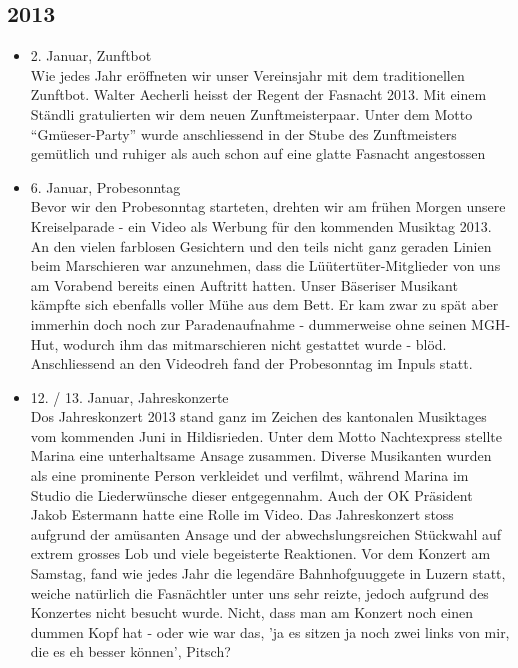 \subsection*{2013}
\begin{history}


      \begin{itemize}

            \item 2. Januar, Zunftbot\\
                  Wie jedes Jahr eröffneten wir unser Vereinsjahr mit dem traditionellen
                  Zunftbot. Walter Aecherli heisst der Regent der Fasnacht 2013. Mit einem
                  Ständli gratulierten wir dem neuen Zunftmeisterpaar. Unter dem Motto
                  \enquote{Gmüeser-Party} wurde anschliessend in der Stube des
                  Zunftmeisters gemütlich und ruhiger als auch schon auf eine glatte
                  Fasnacht angestossen

            \item 6. Januar, Probesonntag\\
                  Bevor wir den Probesonntag starteten, drehten wir am frühen Morgen
                  unsere Kreiselparade - ein Video als Werbung für den kommenden Musiktag
                  2013. An den vielen farblosen Gesichtern und den teils nicht ganz
                  geraden Linien beim Marschieren war anzunehmen, dass die
                  Lüütertüter-Mitglieder von uns am Vorabend bereits einen Auftritt
                  hatten. Unser Bäseriser Musikant kämpfte sich ebenfalls voller Mühe aus
                  dem Bett. Er kam zwar zu spät aber immerhin doch noch zur
                  Paradenaufnahme - dummerweise ohne seinen MGH-Hut, wodurch ihm das
                  mitmarschieren nicht gestattet wurde - blöd. Anschliessend an den
                  Videodreh fand der Probesonntag im Inpuls statt.

            \item 12. / 13. Januar, Jahreskonzerte\\
                  Dos Jahreskonzert 2013 stand ganz im Zeichen des kantonalen Musiktages
                  vom kommenden Juni in Hildisrieden. Unter dem Motto Nachtexpress stellte
                  Marina eine unterhaltsame Ansage zusammen. Diverse Musikanten wurden als
                  eine prominente Person verkleidet und verfilmt, während Marina im Studio
                  die Liederwünsche dieser entgegennahm. Auch der OK Präsident Jakob
                  Estermann hatte eine Rolle im Video. Das Jahreskonzert stoss aufgrund
                  der amüsanten Ansage und der abwechslungsreichen Stückwahl auf extrem
                  grosses Lob und viele begeisterte Reaktionen. Vor dem Konzert am
                  Samstag, fand wie jedes Jahr die legendäre Bahnhofguuggete in Luzern
                  statt, weiche natürlich die Fasnächtler unter uns sehr reizte, jedoch
                  aufgrund des Konzertes nicht besucht wurde. Nicht, dass man am Konzert
                  noch einen dummen Kopf hat - oder wie war das, 'ja es sitzen ja noch
                  zwei links von mir, die es eh besser können’, Pitsch?


\end{itemize}
\end{history}
